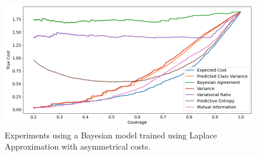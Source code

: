 \begin{figure}[h]
	\includegraphics[width=\textwidth]{images/multi-class/laplace-asym.png}
	\caption{Experiments using a Bayesian model trained using Laplace Approximation with asymmetrical costs.}
\end{figure}